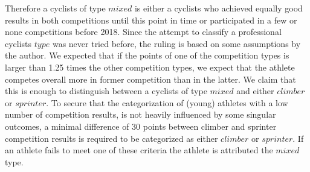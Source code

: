 \documentclass[12pt,a4paper]{article}
\begin{document}
Therefore a cyclists of type \(mixed\) is either a cyclists who achieved equally good results in both competitions until this point in time or participated in a few or none competitions before 2018. Since the attempt to classify a professional cyclists \(type\) was never tried before, the ruling is based on some assumptions by the author. We expected that if the points of one of the competition types is larger than 1.25 times the other competition types, we expect that the athlete competes overall more in former competition than in the latter. We claim that this is enough to distinguish between a cyclists of type \(mixed\) and either \(climber\) or \(sprinter\). To secure that the categorization of (young) athletes with a low number of competition results, is not heavily influenced by some singular outcomes, a minimal difference of 30 points between climber and sprinter competition results is required to be categorized as either \(climber\) or \(sprinter\). If an athlete fails to meet one of these criteria the athlete is attributed the \(mixed\) type.
\end{document}
